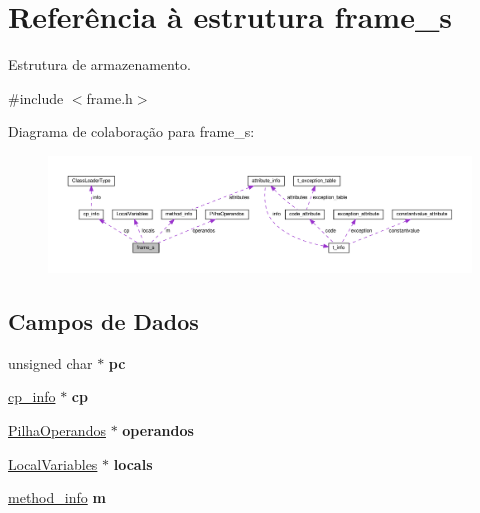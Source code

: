 \hypertarget{structframe__s}{}\section{Referência à estrutura frame\+\_\+s}
\label{structframe__s}


Estrutura de armazenamento.  




{\ttfamily \#include $<$frame.\+h$>$}



Diagrama de colaboração para frame\+\_\+s\+:\nopagebreak
\begin{figure}[H]
\begin{center}
\leavevmode
\includegraphics[width=350pt]{structframe__s__coll__graph}
\end{center}
\end{figure}
\subsection*{Campos de Dados}
\begin{DoxyCompactItemize}
\item 
\mbox{\label{structframe__s_a74703c716b34b0be42af1c698ef9f621}} 
unsigned char $\ast$ {\bfseries pc}
\item 
\mbox{\label{structframe__s_a9e281d20d1a4393e4744dd1d07de5126}} 
\hyperlink{structcp__info}{cp\+\_\+info} $\ast$ {\bfseries cp}
\item 
\mbox{\label{structframe__s_a5377bbe53d53c855f8e11544cb26c9d2}} 
\hyperlink{classPilhaOperandos}{Pilha\+Operandos} $\ast$ {\bfseries operandos}
\item 
\mbox{\label{structframe__s_a4c0fe214398d7c0b688465bbed8a36d1}} 
\hyperlink{classLocalVariables}{Local\+Variables} $\ast$ {\bfseries locals}
\item 
\mbox{\label{structframe__s_aa771844a4dc507d1c37bfb5b378889e3}} 
\hyperlink{structmethod__info}{method\+\_\+info} {\bfseries m}
\end{DoxyCompactItemize}


